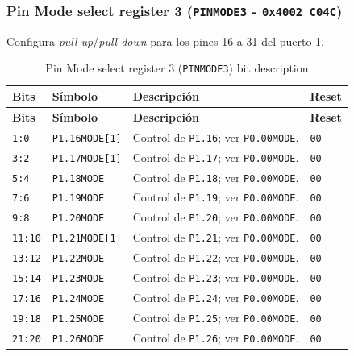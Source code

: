 \subsubsection{Pin Mode select register 3 (\texttt{PINMODE3} - \texttt{0x4002 C04C})}
Configura \textit{pull-up}/\textit{pull-down} para los pines 16 a 31 del puerto 1.

\begin{longtable}{|>{\raggedright\arraybackslash}p{}|>{\raggedright\arraybackslash}p{}|>{\raggedright\arraybackslash}p{}|>{\centering\arraybackslash}p{}|}
\caption{Pin Mode select register 3 (\texttt{PINMODE3}) bit description}\\
\hline
\textbf{Bits} & \textbf{Símbolo} & \textbf{Descripción} & \textbf{Reset} \\
\hline
\endfirsthead
\hline
\textbf{Bits} & \textbf{Símbolo} & \textbf{Descripción} & \textbf{Reset} \\
\hline
\endhead
\texttt{1:0} & \texttt{P1.16MODE[1]} & Control de \texttt{P1.16}; ver \texttt{P0.00MODE}. & \texttt{00} \\
\hline
\texttt{3:2} & \texttt{P1.17MODE[1]} & Control de \texttt{P1.17}; ver \texttt{P0.00MODE}. & \texttt{00} \\
\hline
\texttt{5:4} & \texttt{P1.18MODE} & Control de \texttt{P1.18}; ver \texttt{P0.00MODE}. & \texttt{00} \\
\hline
\texttt{7:6} & \texttt{P1.19MODE} & Control de \texttt{P1.19}; ver \texttt{P0.00MODE}. & \texttt{00} \\
\hline
\texttt{9:8} & \texttt{P1.20MODE} & Control de \texttt{P1.20}; ver \texttt{P0.00MODE}. & \texttt{00} \\
\hline
\texttt{11:10} & \texttt{P1.21MODE[1]} & Control de \texttt{P1.21}; ver \texttt{P0.00MODE}. & \texttt{00} \\
\hline
\texttt{13:12} & \texttt{P1.22MODE} & Control de \texttt{P1.22}; ver \texttt{P0.00MODE}. & \texttt{00} \\
\hline
\texttt{15:14} & \texttt{P1.23MODE} & Control de \texttt{P1.23}; ver \texttt{P0.00MODE}. & \texttt{00} \\
\hline
\texttt{17:16} & \texttt{P1.24MODE} & Control de \texttt{P1.24}; ver \texttt{P0.00MODE}. & \texttt{00} \\
\hline
\texttt{19:18} & \texttt{P1.25MODE} & Control de \texttt{P1.25}; ver \texttt{P0.00MODE}. & \texttt{00} \\
\hline
\texttt{21:20} & \texttt{P1.26MODE} & Control de \texttt{P1.26}; ver \texttt{P0.00MODE}. & \texttt{00} \\

\end{longtable}
